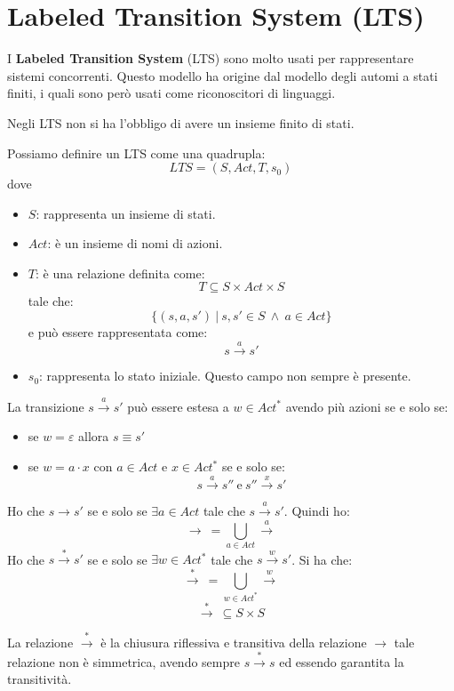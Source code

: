 \section{Labeled Transition System (LTS)}
I \textbf{Labeled Transition System} (LTS) sono molto usati per rappresentare sistemi concorrenti. Questo modello ha origine dal modello degli automi a stati finiti, i quali sono però usati come riconoscitori di linguaggi.

Negli LTS non si ha l'obbligo di avere un insieme finito di stati.
\begin{definizione}
    Possiamo definire un LTS come una quadrupla: $$LTS = (S, Act, T, s_0)$$ dove 
    \begin{itemize}
        \item \textbf{$S$}: rappresenta un insieme di stati.
        \item \textbf{$Act$}: è un insieme di nomi di azioni.
        \item \textbf{$T$}: è una relazione definita come: $$T \subseteq S \times Act \times S$$ tale che: $$\{(s, a, s') \ | \ s, s' \in S \ \land \ a \in Act \}$$ e può essere rappresentata come: $$s \xrightarrow{a} s'$$
        \item \textbf{$s_0$}: rappresenta lo stato iniziale. Questo campo non sempre è presente.
    \end{itemize}
\end{definizione}

La transizione $s \xrightarrow{a} s'$ può essere estesa a $w \in Act^{\ast}$ avendo più azioni se e solo se:
\begin{itemize}
    \item se $w = \varepsilon$ allora $s \equiv s'$
    \item se $w = a \cdot x$ con $a \in Act$ e $x \in Act^{\ast}$ se e solo se: $$s \xrightarrow{a} s'' \ \text{e} \ s'' \xrightarrow{x} s'$$
\end{itemize}

Ho che $s \rightarrow s'$ se e solo se $\exists a \in Act$  tale che $s \xrightarrow{a} s'$. Quindi ho: $$\rightarrow \ = \bigcup_{a \in Act} \xrightarrow{a}$$ Ho che $s \xrightarrow{\ast} s'$ se e solo se $\exists w \in Act^{\ast}$ tale che $s \xrightarrow{w} s'$. Si ha che: $$\xrightarrow{\ast} \ = \bigcup_{w \in Act^{\ast}} \xrightarrow{w}$$ $$\xrightarrow{\ast} \ \subseteq S \times S$$

La relazione $\xrightarrow{\ast}$ è la chiusura riflessiva e transitiva della relazione $\rightarrow$ tale relazione non è simmetrica, avendo sempre $s \xrightarrow{\ast} s$ ed essendo garantita la transitività.
